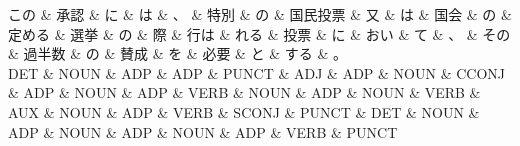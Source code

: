 \documentclass[tikz,border=5pt]{standalone}
\begin{document}
\small
\begin{dependency}[edge unit distance=8.6pt]
    \begin{deptext}[column sep=0.5em]
        この \& 承認 \& に \& は \& 、 \& 特別 \& の \& 国民投票 \& 又 \& は \& 国会 \& の \& 定める \& 選挙 \& の \& 際 \& 行は \& れる \& 投票 \& に \& おい \& て \& 、 \& その \& 過半数 \& の \& 賛成 \& を \& 必要 \& と \& する \& 。\\
        DET \& NOUN \& ADP \& ADP \& PUNCT \& ADJ \& ADP \& NOUN \& CCONJ \& ADP \& NOUN \& ADP \& VERB \& NOUN \& ADP \& NOUN \& VERB \& AUX \& NOUN \& ADP \& VERB \& SCONJ \& PUNCT \& DET \& NOUN \& ADP \& NOUN \& ADP \& NOUN \& ADP \& VERB \& PUNCT\\
    \end{deptext}
\end{dependency}
\end{document}
